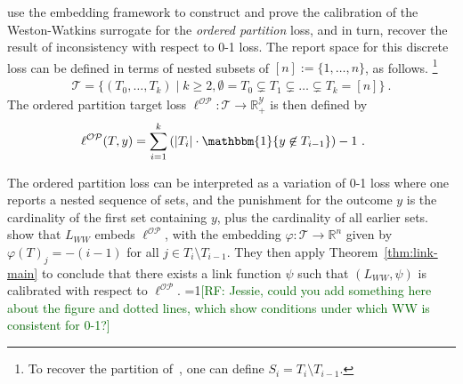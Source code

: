 \documentclass[11pt]{article}
\newcommand{\Comments}{1}
\newcommand{\mynote}[2]{\ifnum\Comments=1\textcolor{#1}{#2}\fi}
\newcommand{\raf}[1]{\mynote{darkgreen}{[RF: #1]}}
\newcommand{\jessie}[1]{\mynote{teal}{[JF: #1]}}
\newcommand{\reals}{\mathbb{R}}
\newcommand{\OP}{\mathcal{OP}}
\newcommand{\T}{\mathcal{T}}
\newcommand{\Y}{\mathcal{Y}}
\newcommand{\ones}{\mathbbm{1}}
\newcommand{\Ind}[1]{\ones\{#1\}}
\begin{document}
\citet*{wang2020weston} use the embedding framework to construct and prove the calibration of the Weston-Watkins surrogate for the \emph{ordered partition} loss, and in turn, recover the result of inconsistency with respect to 0-1 loss.
The report space for this discrete loss can be defined in terms of nested subsets of $[n] := \{1, \ldots, n\}$, as follows.%
\footnote{To recover the partition of~\citet{wang2020weston}, one can define $S_i = T_i \setminus T_{i-1}$.}
\begin{align*}
\T = \{ (T_0,\ldots,T_k) \mid k \geq 2, \emptyset = T_0 \subsetneq T_1 \subsetneq \ldots \subsetneq T_k = [n]\}~.
\end{align*}
The ordered partition target loss $\ell^{\OP} : \T \to \reals^\Y_+$ is then defined by
\begin{align*}
\ell^\OP(T,y) &= \sum_{i=1}^{k} \left(|T_{i}| \cdot \Ind{y \not \in T_{i-1}} \right) -1~.~
\end{align*}

The ordered partition loss can be interpreted as a variation of 0-1 loss where one reports a nested sequence of sets, and the punishment for the outcome $y$ is the cardinality of the first set containing $y$, plus the cardinality of all earlier sets.
\citet{wang2020weston} show that $L_{WW}$ embeds $\ell^\OP$, with the embedding
$\varphi : \T \to \reals^n$ given by $\varphi(T)_j = -(i-1)$ for all $j \in T_i \setminus T_{i-1}$.
They then apply Theorem~\ref{thm:link-main} to conclude that there exists a link function $\psi$ such that $(L_{WW},\psi)$ is calibrated with respect to $\ell^\OP$.
\raf{Jessie, could you add something here about the figure and dotted lines, which show conditions under which WW is consistent for 0-1?}
\end{document}
